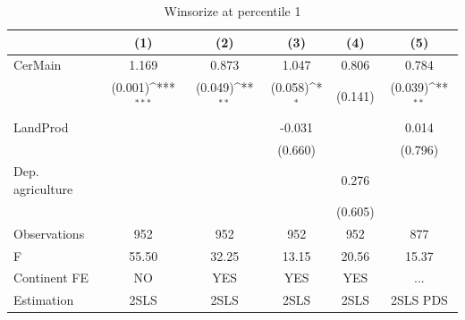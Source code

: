 \documentclass[12pt,a4paper]{article}
\begin{document}
\begin{table}[htbp]\centering
\def\sym#1{\ifmmode^{#1}\else\(^{#1}\)\fi}
\caption{Winsorize at percentile 1}
\begin{tabular}{l*{5}{c}}
\hline\hline
                &\multicolumn{1}{c}{(1)}         &\multicolumn{1}{c}{(2)}         &\multicolumn{1}{c}{(3)}         &\multicolumn{1}{c}{(4)}         &\multicolumn{1}{c}{(5)}         \\
\hline
CerMain         &    1.169         &    0.873         &    1.047         &    0.806         &    0.784         \\
                &  (0.001)\sym{***}&  (0.049)\sym{**} &  (0.058)\sym{*}  &  (0.141)         &  (0.039)\sym{**} \\
LandProd        &                  &                  &   -0.031         &                  &    0.014         \\
                &                  &                  &  (0.660)         &                  &  (0.796)         \\
Dep. agriculture&                  &                  &                  &    0.276         &                  \\
                &                  &                  &                  &  (0.605)         &                  \\
\hline
Observations    &      952         &      952         &      952         &      952         &      877         \\
F               &    55.50         &    32.25         &    13.15         &    20.56         &    15.37         \\
Continent FE    &       NO         &      YES         &      YES         &      YES         &      ...         \\
Estimation      &     2SLS         &     2SLS         &     2SLS         &     2SLS         & 2SLS PDS         \\
\hline\hline
\end{tabular}
\end{table}
\end{document}
